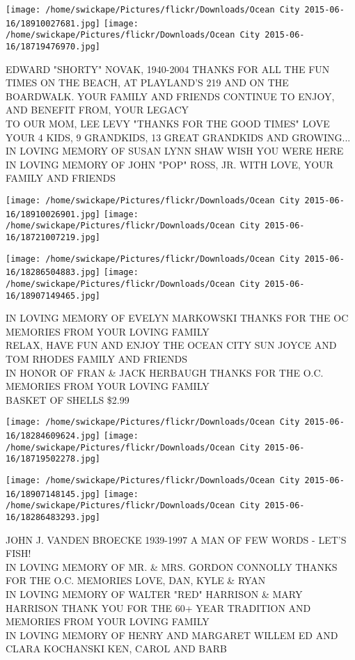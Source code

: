 \documentclass[10pt,letterpaper]{article}
\begin{document}
\texttt{[image: /home/swickape/Pictures/flickr/Downloads/Ocean City 2015-06-16/18910027681.jpg]}
\texttt{[image: /home/swickape/Pictures/flickr/Downloads/Ocean City 2015-06-16/18719476970.jpg]}

EDWARD "SHORTY" NOVAK, 1940{-}2004 THANKS FOR ALL THE FUN TIMES ON THE BEACH, AT PLAYLAND'S 219 AND ON THE BOARDWALK.  YOUR FAMILY AND FRIENDS CONTINUE TO ENJOY, AND BENEFIT FROM, YOUR LEGACY\\
TO OUR MOM, LEE LEVY "THANKS FOR THE GOOD TIMES" LOVE YOUR 4 KIDS, 9 GRANDKIDS, 13 GREAT GRANDKIDS AND GROWING...\\
IN LOVING MEMORY OF SUSAN LYNN SHAW WISH YOU WERE HERE\\
IN LOVING MEMORY OF JOHN "POP" ROSS, JR. WITH LOVE, YOUR FAMILY AND FRIENDS
\pagebreak

\texttt{[image: /home/swickape/Pictures/flickr/Downloads/Ocean City 2015-06-16/18910026901.jpg]}
\texttt{[image: /home/swickape/Pictures/flickr/Downloads/Ocean City 2015-06-16/18721007219.jpg]}

\texttt{[image: /home/swickape/Pictures/flickr/Downloads/Ocean City 2015-06-16/18286504883.jpg]}
\texttt{[image: /home/swickape/Pictures/flickr/Downloads/Ocean City 2015-06-16/18907149465.jpg]}

IN LOVING MEMORY OF EVELYN MARKOWSKI THANKS FOR THE OC MEMORIES FROM YOUR LOVING FAMILY\\
RELAX, HAVE FUN AND ENJOY THE OCEAN CITY SUN JOYCE AND TOM RHODES FAMILY AND FRIENDS\\
IN HONOR OF FRAN \& JACK HERBAUGH THANKS FOR THE O.C. MEMORIES FROM YOUR LOVING FAMILY\\
BASKET OF SHELLS \$2.99
\pagebreak

\texttt{[image: /home/swickape/Pictures/flickr/Downloads/Ocean City 2015-06-16/18284609624.jpg]}
\texttt{[image: /home/swickape/Pictures/flickr/Downloads/Ocean City 2015-06-16/18719502278.jpg]}

\texttt{[image: /home/swickape/Pictures/flickr/Downloads/Ocean City 2015-06-16/18907148145.jpg]}
\texttt{[image: /home/swickape/Pictures/flickr/Downloads/Ocean City 2015-06-16/18286483293.jpg]}

JOHN J. VANDEN BROECKE 1939{-}1997 A MAN OF FEW WORDS {-} LET'S FISH!\\
IN LOVING MEMORY OF MR. \& MRS. GORDON CONNOLLY THANKS FOR THE O.C. MEMORIES LOVE, DAN, KYLE \& RYAN\\
IN LOVING MEMORY OF WALTER "RED" HARRISON \& MARY HARRISON THANK YOU FOR THE 60+ YEAR TRADITION AND MEMORIES FROM YOUR LOVING FAMILY\\
IN LOVING MEMORY OF HENRY AND MARGARET WILLEM ED AND CLARA KOCHANSKI KEN, CAROL AND BARB
\pagebreak
\end{document}
